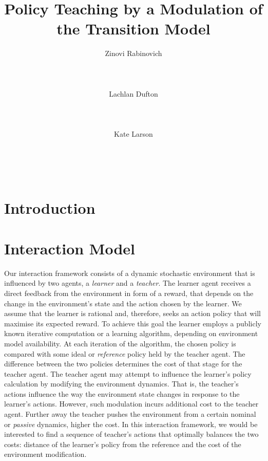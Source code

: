\documentclass[letterpaper]{aamas2009}
\author{\alignauthor Zinovi Rabinovich\\
  \affaddr{Electronics and Computer Science}\\
  \affaddr{University of Southampton}\\
  \affaddr{Southampton, United Kingdom}\\
  \email{zr@ecs.soton.ac.uk}
\alignauthor Lachlan Dufton\\ 
  \affaddr{Cheriton School of Computer Science}\\
  \affaddr{University of Waterloo}\\
  \affaddr{Waterloo, Canada}\\
  \email{ltdufton@cs.uwaterloo.ca}
\alignauthor Kate Larson\\
  \affaddr{Cheriton School of Computer Science}\\
  \affaddr{University of Waterloo}\\
  \affaddr{Waterloo, Canada}\\
  \email{klarson@cs.uwaterloo.ca}
}
\title{Policy  Teaching by a Modulation of the Transition Model}
\begin{document}
\maketitle

\section{Introduction}
\nocite{taylor_PhD_2008}
\nocite{taylor_stone_2009}
\nocite{fleming_hernandez-hernandez_CDC_97}
\nocite{todorov_2009_framework_sup}
\nocite{todorov_2009_framework}
\nocite{ng_russell_2000}
\nocite{zhang_parkes_2008}
\nocite{zhang_parkes_2009_ed}
\nocite{dufton_larson_2009}
\nocite{banerjee_peng_2005}

\section{Interaction Model}
Our interaction framework consists of a dynamic stochastic environment
that is influenced by two agents, a {\em learner} and a {\em
  teacher}. The learner agent receives a direct feedback from the
environment in form of a reward, that depends on the change in the
environment's state and the action chosen by the learner. We assume
that the learner is rational and, therefore, seeks an action policy
that will maximise its expected reward. To achieve this goal the
learner employs a publicly known iterative computation or a learning
algorithm, depending on environment model availability. At each
iteration of the algorithm, the chosen policy is compared with some
ideal or {\em reference} policy held by the teacher agent. The
difference between the two policies determines the cost of that stage
for the teacher agent. The teacher agent may attempt to influence the
learner's policy calculation by modifying the environment
dynamics. That is, the teacher's actions influence the way the
environment state changes in response to the learner's
actions. However, such modulation incurs additional cost to the
teacher agent. Further away the teacher pushes the environment from a
certain nominal or {\em passive} dynamics, higher the cost. In this
interaction framework, we would be interested to find a sequence of
teacher's actions that optimally balances the two costs: distance of
the learner's policy from the reference and the cost of the
environment modification.
\end{document}
